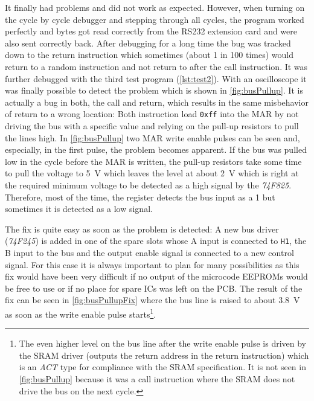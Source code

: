 It finally had problems and did not work as expected.
However, when turning on the cycle by cycle debugger and stepping through all cycles, the program worked perfectly and bytes got read correctly from the RS232 extension card and were also sent correctly back.
After debugging for a long time the bug was tracked down to the return instruction which sometimes (about 1 in 100 times) would return to a random instruction and not return to after the call instruction.
It was further debugged with the third test program (\cref{lst:test2}).
With an oscilloscope it was finally possible to detect the problem which is shown in \cref{fig:busPullup}.
It is actually a bug in both, the call and return, which results in the same misbehavior of return to a wrong location:
Both instruction load \texttt{0xff} into the \gls{MAR} by not driving the bus with a specific value and relying on the pull-up resistors to pull the lines high.
In \cref{fig:busPullup} two \gls{MAR} write enable pulses can be seen and, especially, in the first pulse, the problem becomes apparent.
If the bus was pulled low in the cycle before the \gls{MAR} is written, the pull-up resistors take some time to pull the voltage to \qty{5}{\volt} which leaves the level at about \qty{2}{\volt} which is right at the required minimum voltage to be detected as a high signal by the \emph{74F825}.
Therefore, most of the time, the register detects the bus input as a 1 but sometimes it is detected as a low signal.

The fix is quite easy as soon as the problem is detected:
A new bus driver (\emph{74F245}) is added in one of the spare slots whose A input is connected to \texttt{H1}, the B input to the bus and the output enable signal is connected to a new control signal.
For this case it is always important to plan for many possibilities as this fix would have been very difficult if no output of the microcode \glspl{EEPROM} would be free to use or if no place for spare \glspl{IC} was left on the \gls{PCB}.
The result of the fix can be seen in \cref{fig:busPullupFix} where the bus line is raised to about \qty{3.8}{\volt} as soon as the write enable pulse starts\footnote{The even higher level on the bus line after the write enable pulse is driven by the \gls{SRAM} driver (outputs the return address in the return instruction) which is an \emph{ACT} type for compliance with the \gls{SRAM} specification. It is not seen in \cref{fig:busPullup} because it was a call instruction where the \gls{SRAM} does not drive the bus on the next cycle.}.

